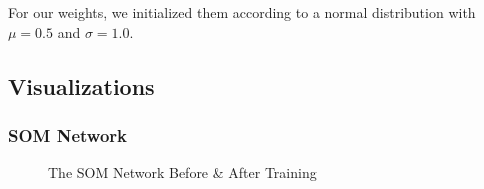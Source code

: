 \documentclass[11pt]{article}
\begin{document}
For our weights, we initialized them according to a normal distribution
with \(\mu = 0.5\) and \(\sigma = 1.0\).

\pagebreak

\subsection{Visualizations}\label{visualizations}

\subsubsection{SOM Network}\label{som-network}

\begin{figure}[h!]
	\centering
	\qquad
	\caption{The SOM Network Before \& After Training}
\end{figure}
\end{document}
